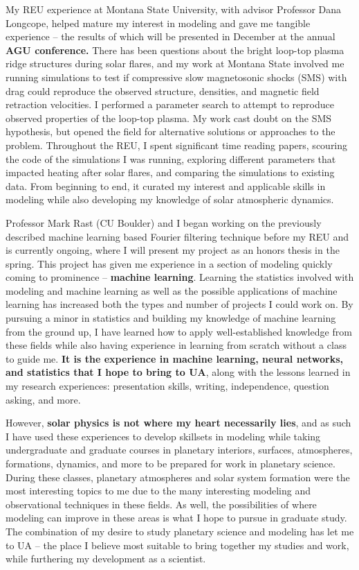 \documentclass[11pt,letterpaper]{article}
\begin{document}
My REU experience at Montana State University, with advisor Professor Dana Longcope, helped mature my interest in modeling and gave me tangible experience – the results of which will be presented in December at the annual \textbf{AGU conference.} There has been questions about the bright loop-top plasma ridge structures during solar flares, and my work at Montana State involved me running simulations to test if compressive slow magnetosonic shocks (SMS) with drag could reproduce the observed structure, densities, and magnetic field retraction velocities. I performed a parameter search to attempt to reproduce observed properties of the loop-top plasma. My work cast doubt on the SMS hypothesis, but opened the field for alternative solutions or approaches to the problem. Throughout the REU, I spent significant time reading papers, scouring the code of the simulations I was running, exploring different parameters that impacted heating after solar flares, and comparing the simulations to existing data. From beginning to end, it curated my interest and applicable skills in modeling while also developing my knowledge of solar atmospheric dynamics. 

Professor Mark Rast (CU Boulder) and I began working on the previously described machine learning based Fourier filtering technique before my REU and is currently ongoing, where I will present my project as an honors thesis in the spring. This project has given me experience in a section of modeling quickly coming to prominence -- \textbf{machine learning}. Learning the statistics involved with modeling and machine learning as well as the possible applications of machine learning has increased both the types and number of projects I could work on. By pursuing a minor in statistics and building my knowledge of machine learning from the ground up, I have learned how to apply well-established knowledge from these fields while also having experience in learning from scratch without a class to guide me. \textbf{It is the experience in machine learning, neural networks, and statistics that I hope to bring to UA}, along with the lessons learned in my research experiences: presentation skills, writing, independence, question asking, and more.

However, \textbf{solar physics is not where my heart necessarily lies}, and as such I have used these experiences to develop skillsets in modeling while taking undergraduate and graduate courses in planetary interiors, surfaces, atmospheres, formations, dynamics, and more to be prepared for work in planetary science. During these classes, planetary atmospheres and solar system formation were the most interesting topics to me due to the many interesting modeling and observational techniques in these fields. As well, the possibilities of where modeling can improve in these areas is what I hope to pursue in graduate study. The combination of my desire to study planetary science and modeling has let me to UA -- the place I believe most suitable to bring together my studies and work, while furthering my development as a scientist.
\end{document}
